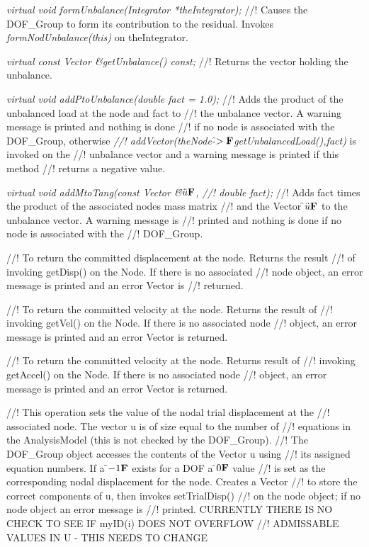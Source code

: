 {\em virtual void formUnbalance(Integrator *theIntegrator); }
//! Causes the DOF\_Group to form its contribution to the residual. Invokes
{\em formNodUnbalance(this)} on \p theIntegrator.

{\em virtual const Vector \&getUnbalance() const; }
//! Returns the vector holding the unbalance.

{\em virtual void  addPtoUnbalance(double fact = 1.0);}
//! Adds the product of the unbalanced load at the node and \p fact to
//! the unbalance vector. A warning message is printed and nothing is done
//! if no node is associated with the DOF\_Group, otherwise {\em
//! addVector(theNode-\f$>{\bf F}$getUnbalancedLoad(),fact)} is invoked on the
//! unbalance vector and a warning message is printed if this method
//! returns a negative value. 

{\em virtual void addMtoTang(const Vector \&\f$\ddot u{\bf F}$,
//! double fact);} 
//! Adds \p fact times the product of the associated nodes mass matrix
//! and the Vector \f$\ddot u{\bf F}$ to the unbalance vector. A warning message is
//! printed and nothing is done if no node is associated with the
//! DOF\_Group.

//! To return the committed displacement at the node. Returns the result
//! of invoking getDisp() on the Node. If there is no associated
//! node object, an error message is printed and an error Vector is
//! returned.


//! To return the committed velocity at the node. Returns the result of
//! invoking getVel() on the Node. If there is no associated node
//! object, an error message is printed and an error Vector is returned.

//! To return the committed velocity at the node. Returns result of
//! invoking  getAccel() on the Node. If there is no associated node
//! object, an error message is printed and an error Vector is returned.

//! This operation sets the value of the nodal trial displacement at the
//! associated node. The vector \p u is of size equal to the number of
//! equations in the AnalysisModel (this is not checked by the DOF\_Group).
//! The DOF\_Group object accesses the contents of the Vector \p u using
//! its assigned equation numbers. If a \f$-1{\bf F}$ exists for a DOF a \f$0{\bf F}$ value
//! is set as the corresponding nodal displacement for the node. Creates a Vector
//! to store the correct components of \p u, then invokes setTrialDisp()
//! on the node object; if no node object an error message is
//! printed. CURRENTLY THERE IS NO CHECK TO SEE IF myID(i) DOES NOT OVERFLOW
//! ADMISSABLE VALUES IN U - THIS NEEDS TO CHANGE


